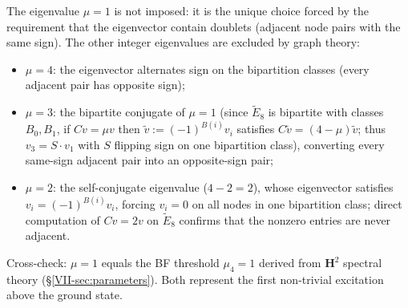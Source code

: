 \begin{remark}[Selection of $\mu = 1$]
The eigenvalue $\mu = 1$ is not imposed: it is the unique choice
forced by the requirement that the eigenvector contain doublets
(adjacent node pairs with the same sign).
The other integer eigenvalues are excluded by graph theory:
\begin{itemize}
\item $\mu = 4$: the eigenvector alternates sign on the
  bipartition classes (every adjacent pair has opposite sign);
\item $\mu = 3$: the bipartite conjugate of $\mu = 1$
  (since $\tilde{E}_8$ is bipartite with classes $B_0, B_1$,
  if $Cv = \mu v$ then $\tilde v := (-1)^{B(i)} v_i$ satisfies
  $C\tilde v = (4-\mu)\tilde v$; thus $v_3 = S \cdot v_1$
  with $S$ flipping sign on one bipartition class), converting
  every same-sign adjacent pair into an opposite-sign pair;
\item $\mu = 2$: the self-conjugate eigenvalue ($4-2=2$), whose
  eigenvector satisfies $v_i = (-1)^{B(i)} v_i$, forcing $v_i = 0$
  on all nodes in one bipartition class; direct computation of
  $Cv = 2v$ on $\tilde{E}_8$ confirms that the nonzero entries
  are never adjacent.
\end{itemize}
Cross-check: $\mu = 1$ equals the BF threshold $\mu_4 = 1$
derived from $\mathbf{H}^2$ spectral theory
(\S\ref*{VII-sec:parameters}).
Both represent the first non-trivial excitation above the ground state.
\end{remark}

